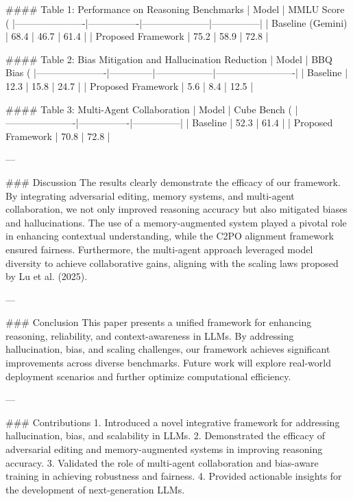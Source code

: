 #### Table 1: Performance on Reasoning Benchmarks  
| Model                | MMLU Score (%
|----------------------|----------------|---------------------|---------------|  
| Baseline (Gemini)    | 68.4           | 46.7                | 61.4          |  
| Proposed Framework   | 75.2           | 58.9                | 72.8          |  

#### Table 2: Bias Mitigation and Hallucination Reduction  
| Model                | BBQ Bias (%
|----------------------|--------------|------------------|-------------------------|  
| Baseline             | 12.3         | 15.8             | 24.7                   |  
| Proposed Framework   | 5.6          | 8.4              | 12.5                   |  

#### Table 3: Multi-Agent Collaboration  
| Model                | Cube Bench (%
|----------------------|----------------|---------------|  
| Baseline             | 52.3           | 61.4          |  
| Proposed Framework   | 70.8           | 72.8          |  

---

### Discussion  
The results clearly demonstrate the efficacy of our framework. By integrating adversarial editing, memory systems, and multi-agent collaboration, we not only improved reasoning accuracy but also mitigated biases and hallucinations. The use of a memory-augmented system played a pivotal role in enhancing contextual understanding, while the C2PO alignment framework ensured fairness. Furthermore, the multi-agent approach leveraged model diversity to achieve collaborative gains, aligning with the scaling laws proposed by Lu et al. (2025).  

---

### Conclusion  
This paper presents a unified framework for enhancing reasoning, reliability, and context-awareness in LLMs. By addressing hallucination, bias, and scaling challenges, our framework achieves significant improvements across diverse benchmarks. Future work will explore real-world deployment scenarios and further optimize computational efficiency.  

---

### Contributions  
1. Introduced a novel integrative framework for addressing hallucination, bias, and scalability in LLMs.  
2. Demonstrated the efficacy of adversarial editing and memory-augmented systems in improving reasoning accuracy.  
3. Validated the role of multi-agent collaboration and bias-aware training in achieving robustness and fairness.  
4. Provided actionable insights for the development of next-generation LLMs.  

